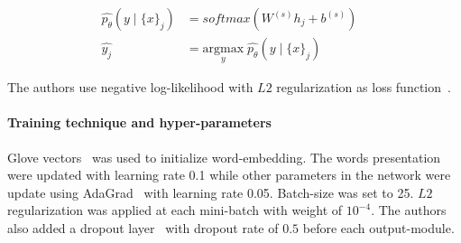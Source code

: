 \begin{align}
      \hat{p_{\theta}}(y \mid \{x\}_j ) &= softmax( W^{(s)} h_j + b^{(s)}) & \\
      \hat{y_j} &= \underset{y}{\mathrm{argmax}} \; \hat{p_{\theta}}(y \mid \{x\}_j ) &
\end{align}

The authors use negative log-likelihood with \(L2\) regularization as loss function~\cite{treeLSTM}.

\paragraph{Training technique and hyper-parameters}
Glove vectors~\cite{glove} was used to initialize word-embedding.
The words presentation were updated with learning rate 0.1 while other parameters in the network were update using AdaGrad~\cite{adagrad} with learning rate 0.05.
Batch-size was set to 25.
\(L2\) regularization was applied at each mini-batch with weight of \(10^{-4}\).
The authors also added a dropout layer~\cite{dropout} with dropout rate of \(0.5\) before each output-module.

